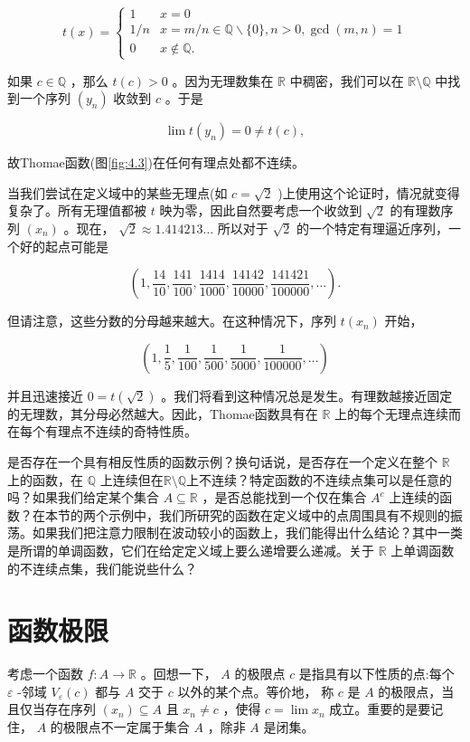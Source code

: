 \[
t\left( x\right)  = \left\{  \begin{array}{ll} 1 & x = 0 \\  1/n & x = m/n \in  \mathbb{Q} \smallsetminus  \{ 0\} , n > 0, \gcd(m,n) = 1 \\  0 & x \notin  \mathbb{Q}. \end{array}\right.
\]

如果 \(c \in  \mathbb{Q}\) ，那么 \(t\left( c\right)  > 0\) 。因为无理数集在 \(\mathbb{R}\) 中稠密，我们可以在 \(\mathbb{R}\setminus\mathbb{Q}\) 中找到一个序列 \(\left( {y}_{n}\right)\) 收敛到 \(c\) 。于是

\[
\lim t\left( {y}_{n}\right)  = 0 \neq  t\left( c\right) ,
\]

故Thomae函数(图\ref{fig:4.3})在任何有理点处都不连续。

当我们尝试在定义域中的某些无理点(如 \(c = \sqrt{2}\) )上使用这个论证时，情况就变得复杂了。所有无理值都被 \(t\) 映为零，因此自然要考虑一个收敛到 \(\sqrt{2}\)  的有理数序列 \(\left( {x}_{n}\right)\) 。现在， \(\sqrt{2} \approx  {1.414213}\ldots\) 所以对于 \(\sqrt{2}\) 的一个特定有理逼近序列，一个好的起点可能是

\[
\left( {1,\frac{14}{10},\frac{141}{100},\frac{1414}{1000},\frac{14142}{10000},\frac{141421}{100000},\ldots }\right) .
\]

但请注意，这些分数的分母越来越大。在这种情况下，序列 \(t\left( {x}_{n}\right)\) 开始，

\[
\left( {1,\frac{1}{5},\frac{1}{100},\frac{1}{500},\frac{1}{5000},\frac{1}{100000},\ldots }\right)
\]

并且迅速接近 \(0 = t\left( \sqrt{2}\right)\) 。我们将看到这种情况总是发生。有理数越接近固定的无理数，其分母必然越大。因此，Thomae函数具有在 \(\mathbb{R}\) 上的每个无理点连续而在每个有理点不连续的奇特性质。

是否存在一个具有相反性质的函数示例？换句话说，是否存在一个定义在整个 \(\mathbb{R}\) 上的函数，在 \(\mathbb{Q}\) 上连续但在$\mathbb{R}\setminus \mathbb{Q}$上不连续？特定函数的不连续点集可以是任意的吗？如果我们给定某个集合 \(A \subseteq  \mathbb{R}\) ，是否总能找到一个仅在集合 \({A}^{c}\) 上连续的函数？在本节的两个示例中，我们所研究的函数在定义域中的点周围具有不规则的振荡。如果我们把注意力限制在波动较小的函数上，我们能得出什么结论？其中一类是所谓的单调函数，它们在给定定义域上要么递增要么递减。关于 \(\mathbb{R}\) 上单调函数的不连续点集，我们能说些什么？

\section{函数极限}
\label{sec:4.2}
考虑一个函数 \(f : A \rightarrow  \mathbb{R}\) 。回想一下， \(A\) 的极限点 \(c\) 是指具有以下性质的点:每个 \(\varepsilon\) -邻域 \({V}_{\varepsilon }\left( c\right)\) 都与 \(A\) 交于 \(c\) 以外的某个点。等价地， 称 \(c\) 是 \(A\) 的极限点，当且仅当存在序列 \(\left( {x}_{n}\right)  \subseteq  A\) 且 \({x}_{n} \neq  c\) ，使得 \(c = \lim {x}_{n}\) 成立。重要的是要记住， \(A\) 的极限点不一定属于集合 \(A\) ，除非 \(A\) 是闭集。

